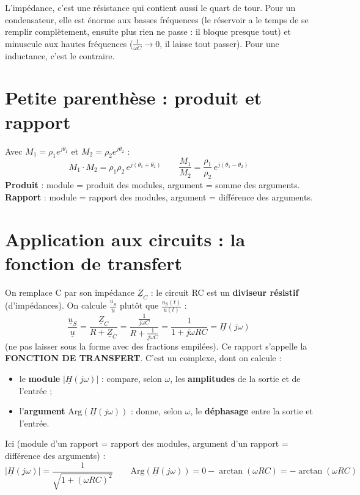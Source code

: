 \begin{goatbox}
L'impédance, c'est une \og résistance\fg{} qui contient aussi le quart de tour. Pour un
condensateur, elle est énorme aux basses fréquences (le réservoir a le temps de se remplir
complètement, ensuite plus rien ne passe : il bloque presque tout) et minuscule aux hautes fréquences ($\frac1{\omega C}\to0$,
il laisse tout passer). Pour une inductance, c'est le contraire.
\end{goatbox}

\section{Petite parenthèse : produit et rapport}


\begin{thmbox}[title=Produit et rapport en module et argument]
Avec $M_1 = \rho_1 e^{j\theta_1}$ et $M_2 = \rho_2 e^{j\theta_2}$ :
\[ M_1\cdot M_2 = \rho_1\rho_2\,e^{j(\theta_1+\theta_2)} \qquad
   \frac{M_1}{M_2} = \frac{\rho_1}{\rho_2}\,e^{j(\theta_1-\theta_2)} \]
\textbf{Produit} : module = produit des modules, argument = somme des arguments.
\textbf{Rapport} : module = rapport des modules, argument = différence des arguments.
\end{thmbox}

\section{Application aux circuits : la fonction de transfert}


\begin{thmbox}[title=Fonction de transfert]
On remplace C par son impédance $\underline Z_C$ : le circuit RC est un \textbf{diviseur
résistif} (d'impédances). On calcule $\frac{\underline u_S}{\underline u}$ plutôt que
$\frac{u_S(t)}{u(t)}$ :
\[ \frac{\underline u_S}{\underline u} = \frac{\underline Z_C}{R + \underline Z_C}
   = \frac{\frac1{j\omega C}}{R + \frac1{j\omega C}} = \frac1{1 + j\omega RC} = \underline H(j\omega) \]
(ne pas laisser sous la forme avec des fractions empilées). Ce rapport s'appelle la
\textbf{FONCTION DE TRANSFERT}. C'est un complexe, dont on calcule :
\begin{itemize}
  \item le \textbf{module} $|\underline H(j\omega)|$ : compare, selon $\omega$, les
        \textbf{amplitudes} de la sortie et de l'entrée ;
  \item l'\textbf{argument} $\mathrm{Arg}(\underline H(j\omega))$ : donne, selon $\omega$, le
        \textbf{déphasage} entre la sortie et l'entrée.
\end{itemize}
Ici (module d'un rapport = rapport des modules, argument d'un rapport = différence des
arguments) :
\[ |\underline H(j\omega)| = \frac{1}{\sqrt{1 + (\omega RC)^2}} \qquad
   \mathrm{Arg}(\underline H(j\omega)) = 0 - \arctan(\omega RC) = -\arctan(\omega RC) \]
\end{thmbox}

